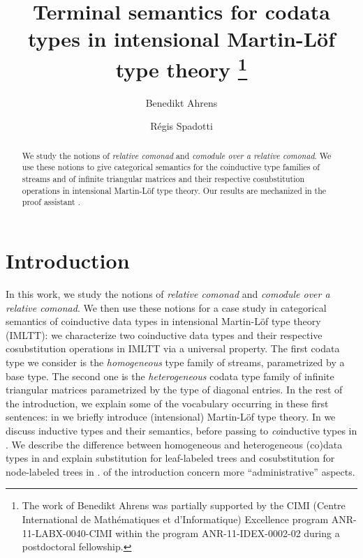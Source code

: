 \documentclass[a4paper,USenglish]{lipics}
\title{Terminal semantics for codata types in intensional Martin-L\"of type theory%
\footnote{The work of Benedikt Ahrens was partially supported by the CIMI (Centre International de Mathématiques et d'Informatique) Excellence program ANR-11-LABX-0040-CIMI within the program ANR-11-IDEX-0002-02 during a postdoctoral fellowship.}
}
\author{Benedikt Ahrens}
\author{R\'egis Spadotti}
\affil{
Institut de Recherche en Informatique de Toulouse\\
Universit\'e Paul Sabatier, 
Toulouse}
\begin{document}
\maketitle


\begin{abstract}
 We study the notions of \emph{relative comonad} and \emph{comodule over a relative comonad}.
 We use these notions to give categorical semantics for the coinductive type families of streams and
 of infinite triangular matrices and their respective cosubstitution operations in intensional Martin-L\"of type theory.
 Our results are mechanized in the proof assistant \coq.
\end{abstract}




\section{Introduction}
 
 In this work, we study the notions of \emph{relative comonad} and \emph{comodule over a relative comonad}.
 We then use these notions for a case study in categorical semantics of coinductive data types in intensional Martin-Löf type theory (IMLTT): 
 we characterize two coinductive data types and their respective cosubstitution operations 
 in IMLTT via a universal property.
 The first codata type we consider is the \emph{homogeneous} type family of streams, parametrized by a base type.
 The second one is the \emph{heterogeneous} codata type family of infinite triangular matrices parametrized by the type of diagonal entries.
  In the rest of the introduction, we explain some of the vocabulary occurring in these first sentences:
  in  we briefly introduce (intensional) Martin-Löf type theory. In  we discuss inductive types and their semantics,
  before passing to \emph{co}inductive types in .
  We describe
  the difference between homogeneous and heterogeneous (co)data types in  and explain substitution for leaf-labeled trees and cosubstitution for node-labeled trees in .
   of the introduction concern more \enquote{administrative} aspects.
  
  
\end{document}

